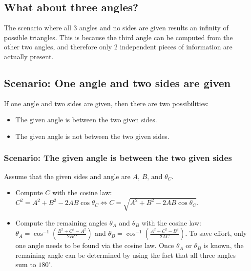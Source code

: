 \documentclass{article}
\begin{document}
\subsection*{What about three angles?}

The scenario where all 3 angles and no sides are given results an infinity of possible triangles. This is because the third angle can be computed from the other two angles, and therefore only 2 independent pieces of information are actually present.



\subsection*{Scenario: One angle and two sides are given}

If one angle and two sides are given, then there are two possibilities:
\begin{itemize}
\item The given angle is between the two given sides.
\item The given angle is not between the two given sides.
\end{itemize}

\subsubsection*{Scenario: The given angle is between the two given sides}

Assume that the given sides and angle are \(A\), \(B\), and \(\theta_C\). 
\begin{itemize}
\item Compute \(C\) with the cosine law: \(C^2 = A^2 + B^2 - 2AB\cos\theta_C \iff C = \sqrt{A^2 + B^2 - 2AB\cos\theta_C}\).
\item Compute the remaining angles \(\theta_A\) and \(\theta_B\) with the cosine law: \(\theta_A = \cos^{-1}\left(\frac{B^2 + C^2 - A^2}{2BC}\right)\) and \(\theta_B = \cos^{-1}\left(\frac{A^2 + C^2 - B^2}{2AC}\right)\). To save effort, only one angle needs to be found via the cosine law. Once \(\theta_A\) or \(\theta_B\) is known, the remaining angle can be determined by using the fact that all three angles sum to \(180^\circ\).
\end{itemize}
\end{document}
